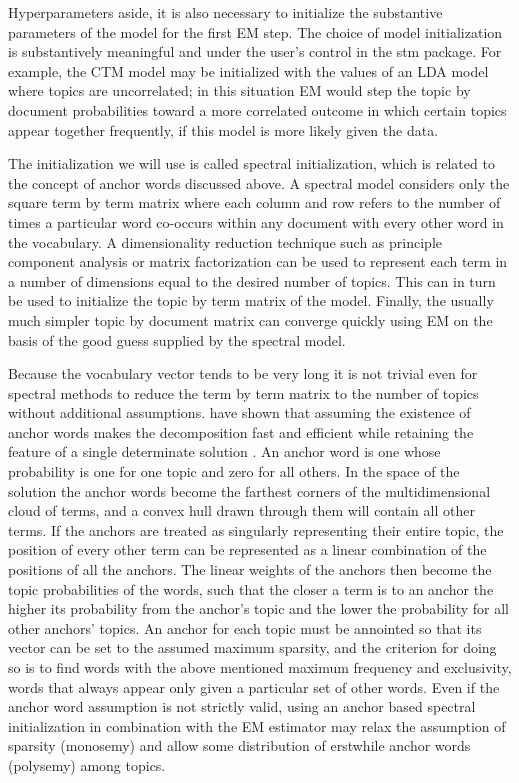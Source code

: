 \documentclass[]{book}
\theoremstyle{definition}
\theoremstyle{definition}
\theoremstyle{definition}
\theoremstyle{remark}
\begin{document}
Hyperparameters aside, it is also necessary to initialize the
substantive parameters of the model for the first EM step. The choice of
model initialization is substantively meaningful and under the user's
control in the stm package. For example, the CTM model may be
initialized with the values of an LDA model where topics are
uncorrelated; in this situation EM would step the topic by document
probabilities toward a more correlated outcome in which certain topics
appear together frequently, if this model is more likely given the data.

The initialization we will use is called spectral initialization, which
is related to the concept of anchor words discussed above. A spectral
model considers only the square term by term matrix where each column
and row refers to the number of times a particular word co-occurs within
any document with every other word in the vocabulary. A dimensionality
reduction technique such as principle component analysis or matrix
factorization can be used to represent each term in a number of
dimensions equal to the desired number of topics. This can in turn be
used to initialize the topic by term matrix of the model. Finally, the
usually much simpler topic by document matrix can converge quickly using
EM on the basis of the good guess supplied by the spectral model.

Because the vocabulary vector tends to be very long it is not trivial
even for spectral methods to reduce the term by term matrix to the
number of topics without additional assumptions.
\citet{Arora2018Learning} have shown that assuming the existence of
anchor words makes the decomposition fast and efficient while retaining
the feature of a single determinate solution
\citep{Roberts2016Navigating}. An anchor word is one whose probability
is one for one topic and zero for all others. In the space of the
solution the anchor words become the farthest corners of the
multidimensional cloud of terms, and a convex hull drawn through them
will contain all other terms. If the anchors are treated as singularly
representing their entire topic, the position of every other term can be
represented as a linear combination of the positions of all the anchors.
The linear weights of the anchors then become the topic probabilities of
the words, such that the closer a term is to an anchor the higher its
probability from the anchor's topic and the lower the probability for
all other anchors' topics. An anchor for each topic must be annointed so
that its vector can be set to the assumed maximum sparsity, and the
criterion for doing so is to find words with the above mentioned maximum
frequency and exclusivity, words that always appear only given a
particular set of other words. Even if the anchor word assumption is not
strictly valid, using an anchor based spectral initialization in
combination with the EM estimator may relax the assumption of sparsity
(monosemy) and allow some distribution of erstwhile anchor words
(polysemy) among topics.
\end{document}
